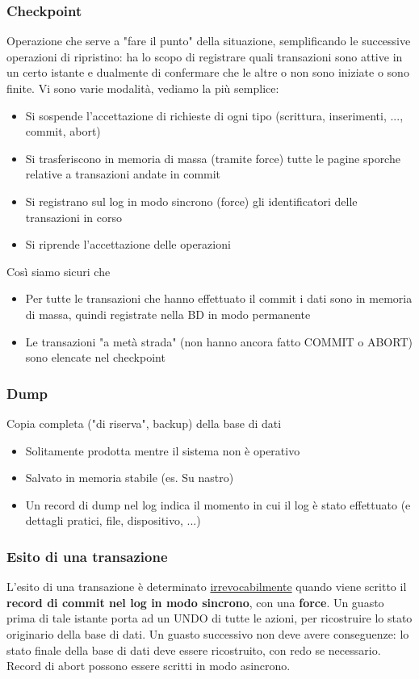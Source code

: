 \documentclass{article}
\begin{document}
		\subsubsection{Checkpoint}
		Operazione che serve a "fare il punto" della situazione, semplificando le successive operazioni di ripristino: ha lo scopo di registrare quali transazioni sono attive in un certo istante e dualmente di confermare che le altre o non sono iniziate o sono finite. Vi sono varie modalità, vediamo la più semplice: \begin{itemize}
			\item Si sospende l'accettazione di richieste di ogni tipo (scrittura,	inserimenti, ..., commit, abort)
			\item Si trasferiscono in memoria di massa (tramite force) tutte le pagine sporche relative a transazioni andate in commit
			\item Si registrano sul log in modo sincrono (force) gli identificatori delle transazioni in corso
			\item Si riprende l'accettazione delle operazioni
		\end{itemize}
		Così siamo sicuri che \begin{itemize}
			\item  Per tutte le transazioni che hanno effettuato il commit i dati sono in memoria di massa, quindi registrate nella BD in modo permanente
			\item Le transazioni "a metà strada" (non hanno ancora fatto
			COMMIT o ABORT) sono elencate nel checkpoint
		\end{itemize}
		
		\subsubsection{Dump}
		Copia completa ("di riserva", backup) della base di dati
		\begin{itemize}
			\item Solitamente prodotta mentre il sistema non è operativo
			\item Salvato in memoria stabile (es. Su nastro)
			\item Un record di dump nel log indica il momento in cui il log è stato effettuato (e dettagli pratici, file, dispositivo, ...)
		\end{itemize}
		
		\subsubsection{Esito di una transazione}
		L'esito di una transazione è determinato \underline{irrevocabilmente} quando viene scritto il \textbf{record di commit nel log in modo sincrono}, con una \textbf{force}. Un guasto prima di tale istante porta ad un UNDO di tutte le
		azioni, per ricostruire lo stato originario della base di dati. Un guasto successivo non deve avere conseguenze: lo stato finale della base di dati deve essere ricostruito, con redo se
		necessario. Record di abort possono essere scritti in modo	asincrono.
		
\end{document}
